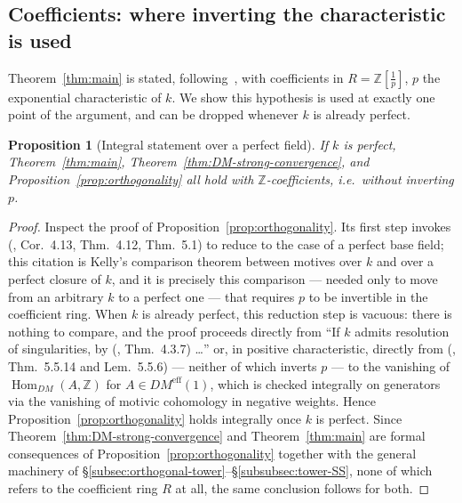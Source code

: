 \documentclass[12pt,a4paper]{article}
\newtheorem{proposition}[theorem]{Proposition}
\theoremstyle{definition}
\newcommand{\Hom}{\operatorname{Hom}}
\newcommand{\Z}{\mathbb{Z}}
\begin{document}
\subsection*{Coefficients: where inverting the characteristic is used}

Theorem~\ref{thm:main} is stated, following~\cite{Pel17}, with coefficients in
$R=\Z[\tfrac1p]$, $p$ the exponential characteristic of $k$.  We show this
hypothesis is used at exactly one point of the argument, and can be dropped
whenever $k$ is already perfect.

\begin{proposition}[Integral statement over a perfect field]
\label{prop:integral-perfect}
If $k$ is perfect, Theorem~\ref{thm:main}, Theorem~\ref{thm:DM-strong-convergence},
and Proposition~\ref{prop:orthogonality} all hold with $\Z$-coefficients, i.e.\
without inverting $p$.
\end{proposition}
\begin{proof}
Inspect the proof of Proposition~\ref{prop:orthogonality}.  Its first step
invokes (\cite{Kel13}, Cor.\ 4.13, Thm.\ 4.12, Thm.\ 5.1) to reduce to the
case of a perfect base field; this citation is Kelly's comparison theorem
between motives over $k$ and over a perfect closure of $k$, and it is
precisely this comparison — needed only to move from an arbitrary $k$ to a
perfect one — that requires $p$ to be invertible in the coefficient ring.
When $k$ is already perfect, this reduction step is vacuous: there is
nothing to compare, and the proof proceeds directly from
``If $k$ admits resolution of singularities, by (\cite{VSF00}, Thm.\ 4.3.7)
\ldots'' or, in positive characteristic, directly from (\cite{Sus17},
Thm.\ 5.5.14 and Lem.\ 5.5.6) — neither of which inverts $p$ — to the
vanishing of $\Hom_{DM}(A,\Z)$ for $A\in DM^{\mathrm{eff}}(1)$, which is
checked integrally on generators via the vanishing of motivic cohomology in
negative weights.  Hence Proposition~\ref{prop:orthogonality} holds
integrally once $k$ is perfect.  Since Theorem~\ref{thm:DM-strong-convergence}
and Theorem~\ref{thm:main} are formal consequences of
Proposition~\ref{prop:orthogonality} together with the general machinery of
\S\ref{subsec:orthogonal-tower}--\S\ref{subsubsec:tower-SS}, none of which
refers to the coefficient ring $R$ at all, the same conclusion follows for
both.
\end{proof}
\end{document}
